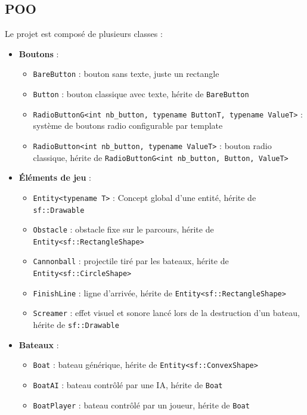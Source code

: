 \documentclass[a4paper,12pt]{article}
\begin{document}
\subsection{POO}
Le projet est composé de plusieurs classes :
\begin{itemize}
    \item \textbf{Boutons} :
    \begin{itemize}
        \item \texttt{BareButton} : bouton sans texte, juste un rectangle
        \item \texttt{Button} : bouton classique avec texte, hérite de \texttt{BareButton}
        \item \texttt{RadioButtonG\textless int nb\_button, typename ButtonT, typename ValueT\textgreater} : système de boutons radio configurable par template
        \item \texttt{RadioButton\textless int nb\_button, typename ValueT\textgreater} : bouton radio classique, hérite de \texttt{RadioButtonG\textless int nb\_button, Button, ValueT\textgreater}
    \end{itemize}
    
    \item \textbf{Éléments de jeu} :
    \begin{itemize}
        \item \texttt{Entity\textless typename T\textgreater} : Concept global d'une entité, hérite de \texttt{sf::Drawable}
        \item \texttt{Obstacle} : obstacle fixe sur le parcours, hérite de \texttt{Entity\textless sf::RectangleShape\textgreater}
        \item \texttt{Cannonball} : projectile tiré par les bateaux, hérite de \texttt{Entity\textless sf::CircleShape\textgreater}
        \item \texttt{FinishLine} : ligne d'arrivée, hérite de \texttt{Entity\textless sf::RectangleShape\textgreater}
        \item \texttt{Screamer} : effet visuel et sonore lancé lors de la destruction d'un bateau, hérite de \texttt{sf::Drawable}
    \end{itemize}
    
    \item \textbf{Bateaux} :
    \begin{itemize}
        \item \texttt{Boat} : bateau générique, hérite de \texttt{Entity\textless sf::ConvexShape\textgreater}
        \item \texttt{BoatAI} : bateau contrôlé par une IA, hérite de \texttt{Boat}
        \item \texttt{BoatPlayer} : bateau contrôlé par un joueur, hérite de \texttt{Boat}
    \end{itemize}
    

\end{itemize}
\end{document}
